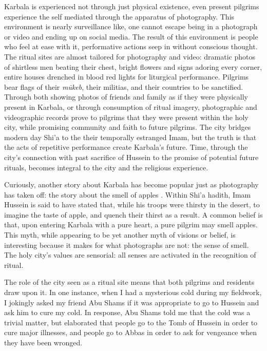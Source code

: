 Karbala is experienced not through just physical existence, even present pilgrims experience the self mediated through the apparatus of photography. This environment is nearly surveillance like, one cannot escape being in a photograph or video and ending up on social media. The result of this environment is people who feel at ease with it, performative actions seep in without conscious thought. The ritual sites are almost tailored for photography and video: dramatic photos of shirtless men beating their chest, bright flowers and signs adoring every corner, entire houses drenched in blood red lights for liturgical performance. Pilgrims bear flags of their \emph{mūkeb}, their militias, and their countries to be sanctified. Through both showing photos of friends and family as if they were physically present in Karbala, or through consumption of ritual imagery, photographic and videographic records prove to pilgrims that they were present within the holy city, while promising community and faith to future pilgrims. The city bridges modern day Shi'a to the their temporally estranged Imam, but the truth is that the acts of repetitive performance create Karbala's future. Time, through the city's connection with past sacrifice of Hussein to the promise of potential future rituals, becomes integral to the city and the religious experience. 

Curiously, another story about Karbala has become popular just as photography has taken off: the story about the smell of apples \cite{sayyid_rasood_interview_2022}. Within Shi'a hadith, Imam Hussein is said to have stated that, while his troops were thirsty in the desert, to imagine the taste of apple, and quench their thirst as a result. A common belief is that, upon entering Karbala with a pure heart, a pure pilgrim may smell apples. This myth, while appearing to be yet another myth of visions or belief, is interesting because it makes for what photographs are not: the sense of smell. The holy city’s values are sensorial: all senses are activated in the recognition of ritual.

The role of the city seen as a ritual site means that both pilgrims and residents draw upon it. In one instance, when I had a mysterious cold during my fieldwork, I jokingly asked my friend Abu Shams if it was appropriate to go to Hussein and ask him to cure my cold. In response, Abu Shams told me that the cold was a trivial matter, but elaborated that people go to the Tomb of Hussein in order to cure major illnesses, and people go to Abbas in order to ask for vengeance when they have been wronged. 

